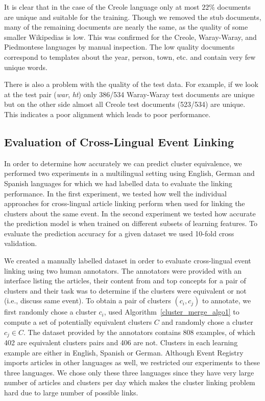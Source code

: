 \documentclass[twoside,11pt]{article}
\begin{document}
It is clear that in the case of the Creole language only at most $22\%$ documents are unique and suitable for the training. Though we removed the stub documents, many of the remaining documents are nearly the same, as the quality of some smaller Wikipedias is low. This was confirmed for the Creole, Waray-Waray, and Piedmontese languages by manual inspection. The low quality documents correspond to templates about the year, person, town, etc. and contain very few unique words.

There is also a problem with the quality of the test data. For example, if we look at the test pair (\emph{war}, \emph{ht}) only 386/534 Waray-Waray test documents are unique but on the other side almost all Creole test documents (523/534) are unique. This indicates a poor alignment which leads to poor performance.

\subsection{Evaluation of Cross-Lingual Event Linking}
In order to determine how accurately we can predict cluster equivalence, we performed two experiments in a multilingual setting using English, German and Spanish languages for which we had labelled data to evaluate the linking performance. In the first experiment, we tested how well  the individual approaches for cross-lingual article linking perform when used for linking the clusters about the same event. In the second experiment we tested how accurate the prediction model is when trained on different subsets of learning features. To evaluate the prediction accuracy for a given dataset we used 10-fold cross validation.

We created a manually labelled dataset in order to evaluate cross-lingual event linking using two human annotators. The annotators were provided with an interface listing the articles, their content from and top concepts for a pair of clusters and their task was to determine if the clusters were equivalent or not (i.e., discuss same event). To obtain a pair of clusters $(c_i, c_j)$ to annotate, we first randomly chose a cluster $c_i$, used Algorithm~\ref{cluster_merge_algo1} to compute a set of potentially equivalent clusters $C$ and randomly chose a cluster $c_j \in C$. The dataset provided by the annotators contains 808 examples, of which 402 are equivalent clusters pairs and 406 are not. Clusters in each learning example are either in English, Spanish or German. Although Event Registry imports articles in other languages as well, we restricted our experiments to these three languages. We chose only these three languages since they have very large number of articles and clusters per day which makes the cluster linking problem hard due to large number of possible links.
\end{document}
